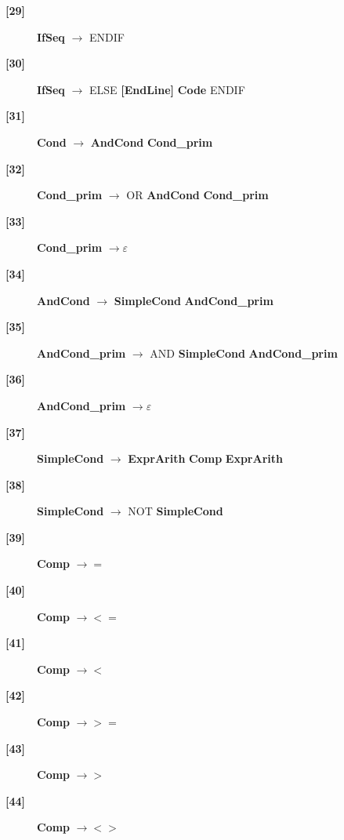 \documentclass[12pt]{article}
\begin{document}
\begin{description}
	\item[\textbf{[29]}]{ \textbf{\textlangle{}IfSeq\textrangle{}}  $\rightarrow$ ENDIF}
	\item[\textbf{[30]}]{ \textbf{\textlangle{}IfSeq\textrangle{}}  $\rightarrow$ ELSE \textbf{[EndLine]} \textbf{\textlangle{}Code\textrangle{}}  ENDIF}
	\item[\textbf{[31]}]{ \textbf{\textlangle{}Cond\textrangle{}}  $\rightarrow$ \textbf{\textlangle{}AndCond\textrangle{}}  \textbf{\textlangle{}Cond\_prim\textrangle{}} }
	\item[\textbf{[32]}]{ \textbf{\textlangle{}Cond\_prim\textrangle{}}  $\rightarrow$ OR \textbf{\textlangle{}AndCond\textrangle{}}  \textbf{\textlangle{}Cond\_prim\textrangle{}} }
	\item[\textbf{[33]}]{ \textbf{\textlangle{}Cond\_prim\textrangle{}}  $\rightarrow \varepsilon$}
	\item[\textbf{[34]}]{ \textbf{\textlangle{}AndCond\textrangle{}}  $\rightarrow$ \textbf{\textlangle{}SimpleCond\textrangle{}}  \textbf{\textlangle{}AndCond\_prim\textrangle{}} }
	\item[\textbf{[35]}]{ \textbf{\textlangle{}AndCond\_prim\textrangle{}}  $\rightarrow$ AND \textbf{\textlangle{}SimpleCond\textrangle{}}  \textbf{\textlangle{}AndCond\_prim\textrangle{}} }
	\item[\textbf{[36]}]{ \textbf{\textlangle{}AndCond\_prim\textrangle{}}  $\rightarrow \varepsilon$}
	\item[\textbf{[37]}]{ \textbf{\textlangle{}SimpleCond\textrangle{}}  $\rightarrow$ \textbf{\textlangle{}ExprArith\textrangle{}}  \textbf{\textlangle{}Comp\textrangle{}}  \textbf{\textlangle{}ExprArith\textrangle{}} }
	\item[\textbf{[38]}]{ \textbf{\textlangle{}SimpleCond\textrangle{}}  $\rightarrow$ NOT \textbf{\textlangle{}SimpleCond\textrangle{}} }
	\item[\textbf{[39]}]{ \textbf{\textlangle{}Comp\textrangle{}}  $\rightarrow =$}
	\item[\textbf{[40]}]{ \textbf{\textlangle{}Comp\textrangle{}}  $\rightarrow <=$}
	\item[\textbf{[41]}]{ \textbf{\textlangle{}Comp\textrangle{}}  $\rightarrow <$}
	\item[\textbf{[42]}]{ \textbf{\textlangle{}Comp\textrangle{}}  $\rightarrow >=$}
	\item[\textbf{[43]}]{ \textbf{\textlangle{}Comp\textrangle{}}  $\rightarrow >$ }
	\item[\textbf{[44]}]{ \textbf{\textlangle{}Comp\textrangle{}}  $\rightarrow <>$ }

\end{description}
\end{document}
